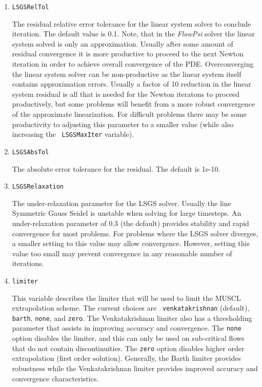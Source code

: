\documentclass{article}
\begin{document}
\begin{enumerate}
\item {\tt LSGSRelTol} 

  The residual relative error tolerance for the linear system solver
  to conclude iteration.  The default value is 0.1.  Note, that in the
  {\em FlowPsi} solver the linear system solved is only an approximation.
  Usually after some amount of residual convergence it is more
  productive to proceed to the next Newton iteration in order to
  achieve overall convergence of the PDE.  Overconverging the linear
  system solver can be non-productive as the linear system itself
  contains approximation errors.  Usually a factor of 10 reduction in
  the linear system residual is all that is needed for the Newton
  iteratons to proceed productively, but some problems will benefit
  from a more robust convergence of the approximate linearization.
  For difficult problems there may be some productivity to adjusting
  this parameter to a smaller value (while also increasing the {\tt
    LSGSMaxIter} variable).

\item {\tt LSGSAbsTol}

  The absolute error tolerance for the residual.  The default is 1e-10.

\item {\tt LSGSRelaxation}

  The under-relaxation parameter for the LSGS solver.  Usually the
  line Symmetric Gauss Seidel is unstable when solving for large
  timesteps.  An under-relaxation parameter of 0.3 (the default)
  provides stability and rapid convergence for most problems.  For
  problems where the LSGS solver diverges, a smaller setting to this
  value may allow convergence.  However, setting this value too small
  may prevent convergence in any reasonable number of iterations.

\item {\tt limiter }

  This variable describes the limiter that will be used to limit the
  MUSCL extrapolation scheme.  The current choices are {\tt
    venkatakrishnan} (default), {\tt barth}, {\tt none}, and {\tt zero}.  
  The Venkatakrishnan limiter also has a thresholding parameter
  that assists in improving accuracy and convergence.  The {\tt none}
  option disables the limiter, and this can only be used on
  sub-critical flows that do not contain discontinuities.  The
  {\tt zero} option disables higher order extrapolation (first order solution).
  Generally, the Barth limiter provides robustness while the Venkatakrishnan
  limiter provides improved accuracy and convergence characteristics.
  

\end{enumerate}
\end{document}
